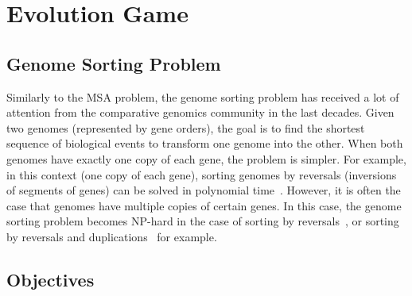 \documentclass{article}
\begin{document}
\begin{enumerate}
\end{enumerate}

\section{Evolution Game}

\subsection{Genome Sorting Problem}

Similarly to the MSA problem, the genome sorting problem has received a lot of attention from the comparative genomics community in the last decades. Given two genomes (represented by gene orders), the goal is to find the shortest sequence of biological events to transform one genome into the other. When both genomes have exactly one copy of each gene, the problem is simpler. For example, in this context (one copy of each gene), sorting genomes by reversals (inversions of segments of genes) can be solved in polynomial time~\cite{hannenhalli1999transforming,tannier2007advances}.
However, it is often the case that genomes have multiple copies of certain genes. In this case, the genome sorting problem becomes NP-hard in the case of sorting by reversals~\cite{christie2001sorting}, or sorting by reversals and duplications~\cite{chen2005assignment} for example.

\subsection{Objectives}
\end{document}
